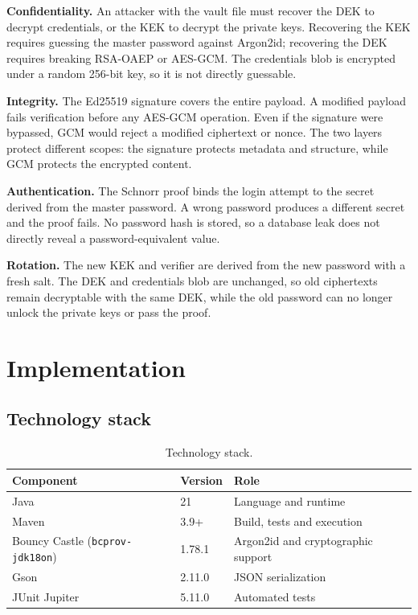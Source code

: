 \documentclass[11pt,a4paper]{article}
\newcommand{\code}[1]{\texttt{#1}}
\begin{document}
\textbf{Confidentiality.} An attacker with the vault file must recover the DEK to
decrypt credentials, or the KEK to decrypt the private keys. Recovering the KEK
requires guessing the master password against Argon2id; recovering the DEK
requires breaking RSA-OAEP or AES-GCM. The credentials blob is encrypted under a
random 256-bit key, so it is not directly guessable.

\textbf{Integrity.} The Ed25519 signature covers the entire payload. A modified
payload fails verification before any AES-GCM operation. Even if the signature
were bypassed, GCM would reject a modified ciphertext or nonce. The two layers
protect different scopes: the signature protects metadata and structure, while
GCM protects the encrypted content.

\textbf{Authentication.} The Schnorr proof binds the login attempt to the secret
derived from the master password. A wrong password produces a different secret
and the proof fails. No password hash is stored, so a database leak does not
directly reveal a password-equivalent value.

\textbf{Rotation.} The new KEK and verifier are derived from the new password
with a fresh salt. The DEK and credentials blob are unchanged, so old
ciphertexts remain decryptable with the same DEK, while the old password can no
longer unlock the private keys or pass the proof.

\section{Implementation}\label{sec:implementation}

\subsection{Technology stack}

\begin{table}[htbp]
\centering
\small
\begin{tabular}{@{}lll@{}}
\toprule
\textbf{Component} & \textbf{Version} & \textbf{Role} \\
\midrule
Java & 21 & Language and runtime \\
Maven & 3.9+ & Build, tests and execution \\
Bouncy Castle (\code{bcprov-jdk18on}) & 1.78.1 & Argon2id and cryptographic support \\
Gson & 2.11.0 & JSON serialization \\
JUnit Jupiter & 5.11.0 & Automated tests \\
\bottomrule
\end{tabular}
\caption{Technology stack.}
\label{tab:stack}
\end{table}
\end{document}
